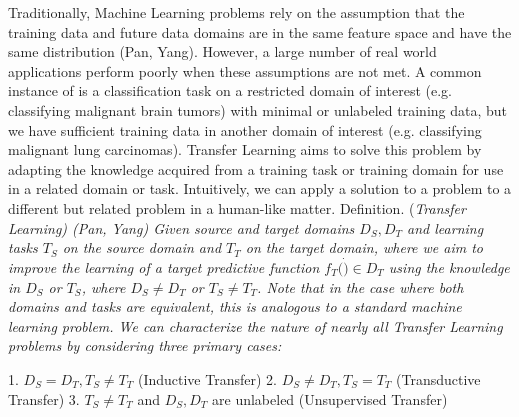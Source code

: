 \documentclass[10pt,twocolumn,letterpaper]{article}
\begin{document}
Traditionally, Machine Learning problems rely on the assumption that the training data and future data domains
are in the same feature space and have the same distribution (Pan, Yang). However, a large number of real world
applications perform poorly when these assumptions are not met. A common instance of is a classification task on
a restricted domain of interest (e.g. classifying malignant brain tumors) with minimal or unlabeled training data,
but we have sufficient training data in another domain of interest (e.g. classifying malignant lung carcinomas).
Transfer Learning aims to solve this problem by adapting the knowledge acquired from a training task or
training domain for use in a related domain or task. Intuitively, we can apply a solution to a problem to a
different but related problem in a human-like matter.
Definition. (\it Transfer Learning) (Pan, Yang)
Given source and target domains $D_S, D_T$ and learning tasks $T_S$ on the source domain and $T_T$ on the target
domain, where we aim to improve the learning of a target predictive function $f_T(\dot)\in D_T$ using
the knowledge in $D_S$ or $T_S$, where $D_S\neq D_T$ or $T_S\neq T_T$. Note that in the case where both domains
and tasks are equivalent, this is analogous to a standard machine learning problem. We can characterize the
nature of nearly all Transfer Learning problems by considering three primary cases:

1. $D_S = D_T, T_S\neq T_T$ (Inductive Transfer)
2. $D_S\neq D_T, T_S = T_T$ (Transductive Transfer)
3. $T_S\neq T_T$ and $D_S, D_T$ are unlabeled (Unsupervised Transfer)
\end{document}
